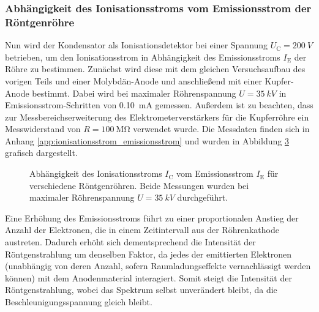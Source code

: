 \documentclass[11pt, a4paper]{article}
\numberwithin{equation}{section}
\begin{document}
\subsubsection{Abhängigkeit des Ionisationsstroms vom Emissionsstrom der Röntgenröhre}
\label{sec:abh_emissionsstrom}
Nun wird der Kondensator als Ionisationsdetektor bei einer Spannung $U_\mathrm{C} = \SI{200}{V}$ betrieben, um den Ionisationsstrom in Abhängigkeit des Emissionsstroms $I_\mathrm{E}$ der Röhre zu bestimmen.
Zunächst wird diese mit dem gleichen Versuchsaufbau des vorigen Teils und einer Molybdän-Anode und anschließend mit einer Kupfer-Anode bestimmt.
Dabei wird bei maximaler Röhrenspannung $U = \SI{35}{kV}$ in Emissionsstrom-Schritten von \SI{0.10}{mA} gemessen.
Außerdem ist zu beachten, dass zur Messbereichserweiterung des Elektrometerverstärkers für die Kupferröhre ein Messwiderstand von $R=\SI{100}{\mega\ohm}$ verwendet wurde.
Die Messdaten finden sich in Anhang \ref{app:ionisationsstrom_emissionsstrom} und wurden in Abbildung \ref{fig:abh_emissionsstrom} grafisch dargestellt.
\begin{figure}[hp]
	\begin{subfigure}[b]{1\textwidth}
		\centering
		
		\label{fig:mo_emissionsstrom}
	\end{subfigure}
	
	\vspace{10mm}
	
	\begin{subfigure}[b]{1\textwidth}
		\centering
		
		\label{fig:cu_emissionsstrom}
	\end{subfigure}
	\caption{Abhängigkeit des Ionisationsstroms $I_\mathrm{C}$ vom Emissionsstrom $I_\mathrm{E}$ für verschiedene Röntgenröhren. Beide Messungen wurden bei maximaler Röhrenspannung $U=\SI{35}{kV}$ durchgeführt.}
	\label{fig:abh_emissionsstrom}
\end{figure}
Eine Erhöhung des Emissionsstroms führt zu einer proportionalen Anstieg der Anzahl der Elektronen, die in einem Zeitintervall aus der Röhrenkathode austreten.
Dadurch erhöht sich dementsprechend die Intensität der Röntgenstrahlung um denselben Faktor, da jedes der emittierten Elektronen (unabhängig von deren Anzahl, sofern Raumladungseffekte vernachlässigt werden können) mit dem Anodenmaterial interagiert.
Somit steigt die Intensität der Röntgenstrahlung, wobei das Spektrum selbst unverändert bleibt, da die Beschleunigungsspannung gleich bleibt.
\end{document}

